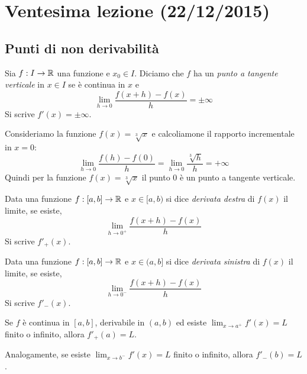 \chapter{Ventesima lezione (22/12/2015)}

\section{Punti di non derivabilità}

Sia $f: I \to \mathbb R$ una funzione e $x_0 \in I$. Diciamo che $f$ ha un \emph{punto a tangente verticale} in $x \in I$ se è continua in $x$ e 
\begin{equation*}
\lim_{h \to 0} \frac{f(x+h)-f(x)}{h} = \pm \infty
\end{equation*}
Si scrive $f'(x) = \pm \infty$.

\begin{example}
Consideriamo la funzione $f(x) = \sqrt[3]{x}$ e calcoliamone il rapporto incrementale in $x = 0$:
\begin{equation*}
\lim_{h \to 0} \frac{f(h)-f(0)}{h} = \lim_{h \to 0} \frac{\sqrt[3]{h}}{h} = +\infty
\end{equation*}
Quindi per la funzione $f(x) = \sqrt[3]{x}$ il punto 0 è un punto a tangente verticale.
\end{example}

\begin{definition}
Data una funzione $f: [a, b] \to \mathbb R$ e $x \in [a, b)$ si dice \emph{derivata destra} di $f(x)$ il limite, se esiste,
\begin{equation*}
\lim_{h \to 0^+} \frac{f(x+h)-f(x)}{h}
\end{equation*}
Si scrive $f'_+(x)$.
\end{definition}

\begin{definition}
Data una funzione $f: [a, b] \to \mathbb R$ e $x \in (a, b]$ si dice \emph{derivata sinistra} di $f(x)$ il limite, se esiste,
\begin{equation*}
\lim_{h \to 0^-} \frac{f(x+h)-f(x)}{h}
\end{equation*}
Si scrive $f'_-(x)$.
\end{definition}

\begin{proposition}
Se $f$ è continua in $[a,b]$, derivabile in $(a,b)$ ed esiste $\lim_{x \to a^+} f'(x) = L$ finito o infinito, allora $f'_+ (a) = L$.

Analogamente, se esiste  $\lim_{x \to b^-} f'(x) = L$ finito o infinito, allora $f'_- (b) = L$.
\end{proposition}

